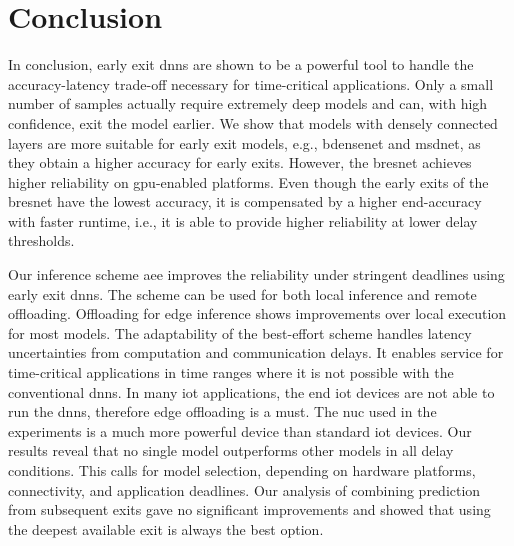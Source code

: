 \hypertarget{conclusion}{%
\chapter{Conclusion}\label{ch:conclusion}}


In conclusion, early exit \gls{dnn}s are shown to be a powerful tool to handle the accuracy-latency trade-off necessary for time-critical applications. Only a small number of samples actually require extremely deep models and can, with high confidence, exit the model earlier. We show that models with densely connected layers are more suitable for early exit models, e.g., \gls{bdensenet} and \gls{msdnet}, as they obtain a higher accuracy for early exits. However, the \gls{bresnet} achieves higher reliability on \gls{gpu}-enabled platforms. Even though the early exits of the \gls{bresnet} have the lowest accuracy, it is compensated by a higher end-accuracy with faster runtime, i.e., it is able to provide higher reliability at lower delay thresholds.

Our inference scheme \gls{aee} improves the reliability under stringent deadlines using early exit \gls{dnn}s. The scheme can be used for both local inference and remote offloading. Offloading for edge inference shows improvements over local execution for most models. The adaptability of the best-effort scheme handles latency uncertainties from computation and communication delays. It enables service for time-critical applications in time ranges where it is not possible with the conventional \gls{dnn}s. In many \gls{iot} applications, the end \gls{iot} devices are not able to run the \gls{dnn}s, therefore edge offloading is a must. The \gls{nuc} used in the experiments is a much more powerful device than standard \gls{iot} devices. Our results reveal that no single model outperforms other models in all delay conditions. This calls for model selection, depending on hardware platforms, connectivity, and application deadlines. Our analysis of combining prediction from subsequent exits gave no significant improvements and showed that using the deepest available exit is always the best option.


